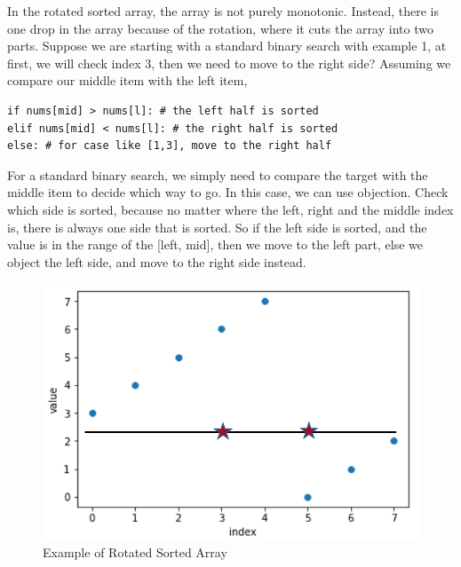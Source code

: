 \documentclass[../searching.tex]{subfiles}
\begin{document}
In the rotated sorted array, the array is not purely monotonic. Instead, there is one drop in the array because of the rotation, where it cuts the array into two parts. Suppose we are starting with a standard binary search with example 1, at first, we will check index 3, then we need to move to the right side?  Assuming we compare our middle item with the left item, 
\begin{lstlisting}[numbers=none]
if nums[mid] > nums[l]: # the left half is sorted
elif nums[mid] < nums[l]: # the right half is sorted
else: # for case like [1,3], move to the right half
\end{lstlisting}
For a standard binary search, we simply need to compare the target with the middle item to decide which way to go. In this case, we can use objection. Check which side is sorted, because no matter where the left, right and the middle index is, there is always one side that is sorted. So if the left side is sorted, and the value is in the range of the [left, mid], then we move to the left part, else we object the left side, and move to the right side instead. 
\begin{figure}[h]
    \centering
    \includegraphics[width=0.7\columnwidth]{fig/rotated_array.png}
    \caption{Example of Rotated Sorted Array}
    \label{fig:rotated_sorted_array}
\end{figure}
\end{document}
